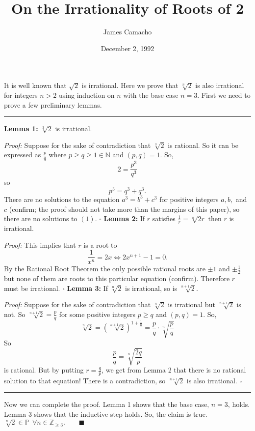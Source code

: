 \documentclass{article}
\author{James Camacho}
\title{On the Irrationality of Roots of 2}
\date{December 2, 1992}
\begin{document}
	\maketitle
	\par
	It is well known that $\sqrt2$ is irrational. Here we prove that $\sqrt[n]{2}$ is also irrational for integers $n > 2$ using induction on $n$ with the base case $n=3$. First we need to prove a few preliminary lemmas.
	\newline
	\hrule
	\vspace{5mm}
	\noindent
	\textbf{Lemma 1:} $\sqrt[3]{2}$ is irrational.
	\par
	\emph{Proof:} Suppose for the sake of contradiction that $\sqrt[3]{2}$ is rational. So it can be expressed as $\frac{p}{q}$ where $p\ge q\ge 1 \in\mathbb{N}$ and $(p, q) = 1.$ So,
	$$2 = \frac{p^3}{q^3}$$
	so
	\begin{equation}
	p^3 = q^3 + q^3.
	\end{equation}
	There are no solutions to the equation $a^3 = b^3 + c^3$ for positive integers $a, b,$ and $c$ (confirm; the proof should not take more than the margins of this paper), so there are no solutions to $(1)$. $\square$
	\vspace{5mm}
	\newline
	\textbf{Lemma 2:} If $r$ satisfies $\frac{1}{r} = \sqrt[n]{2r}$ then $r$ is irrational.
	\par
	\emph{Proof:} This implies that $r$ is a root to
	$$\frac{1}{x^n} = 2x\Longleftrightarrow 2x^{n+1} - 1 = 0.$$
	By the Rational Root Theorem the only possible rational roots are $\pm 1$  and $\pm \frac{1}{2}$ but none of them are roots to this particular equation (confirm). Therefore $r$ must be irrational. $\square$
	\vspace{5mm}
	\newline
	\textbf{Lemma 3:} If $\sqrt[n]{2}$ is irrational, so is $\sqrt[n+1]{2}$.
	\par
	\emph{Proof:} Suppose for the sake of contradiction that $\sqrt[n]{2}$ is irrational but $\sqrt[n+1]{2}$ is not. So $\sqrt[n+1]{2} = \frac{p}{q}$ for some positive integers $p\ge q$ and $(p, q) = 1$. So,
	$$\sqrt[n]{2} = \left(\sqrt[n+1]{2}\right)^{1+\frac{1}{n}} = \frac{p}{q}\cdot \sqrt[n]{\frac{p}{q}}$$
	So
	$$\frac{p}{q} = \sqrt[n]{\frac{2q}{p}}$$
	is rational. But by putting $r=\frac{q}{p}$, we get from Lemma 2 that there is no rational solution to that equation! There is a contradiction, so $\sqrt[n+1]{2}$ is also irrational. $\square$
	\newline
	\hrule
	\vspace{5mm}
	\par
	Now we can complete the proof. Lemma 1 shows that the base case, $n=3$, holds. Lemma 3 shows that the inductive step holds. So, the claim is true. $\sqrt[n]{2}\in\mathbb{P}\ \ \forall n\in\mathbb{Z}_{\ge 3}.\qquad \blacksquare$
	
\end{document}

